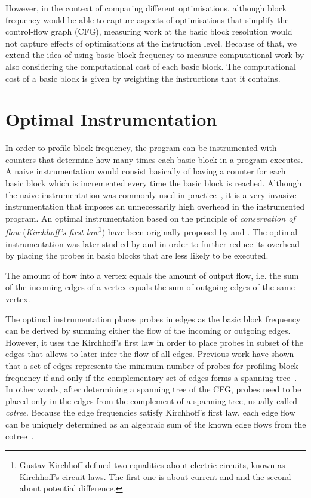 However, in the context of comparing different optimisations, although block frequency would be able to capture aspects of optimisations that simplify the control-flow graph (CFG), measuring work at the basic block resolution would not capture effects of optimisations at the instruction level.
Because of that, we extend the idea of using basic block frequency to measure computational work by also considering the computational cost of each basic block.
The computational cost of a basic block is given by weighting the instructions that it contains.

\section{Optimal Instrumentation} \label{subsec:optimalInstrumentation}

In order to profile  block frequency, the program can be instrumented with counters that determine how many times each basic block in a program executes.
A naive instrumentation would consist basically of having a counter for each basic block which is incremented every time the basic block is reached.
Although the naive instrumentation was commonly used in practice~\citep{knuth71}, it is a very invasive instrumentation that imposes an unnecessarily high overhead in the instrumented program.
An optimal instrumentation based on the principle of \textit{conservation of flow} (\textit{Kirchhoff's first law}\footnote{Gustav Kirchhoff defined two equalities about electric circuits, known as Kirchhoff's circuit laws. The first one is about current and and the second about potential difference.}) have been originally proposed by \cite{nahapetian73} and \cite{knuth73}.
The optimal instrumentation was later studied by \cite{forman81} and \cite{ball94} in order to further reduce its overhead by placing the probes in basic blocks that are less likely to be executed.

\begin{definition}
The amount of flow into a vertex equals the amount of output flow, i.e. the sum of the incoming edges of a vertex equals the sum of outgoing edges of the same vertex.
\end{definition}

The optimal instrumentation places probes in edges as the basic block frequency can be derived by summing either the flow of the incoming or outgoing edges.
However, it uses the Kirchhoff's first law in order to place probes in subset of the edges that allows to later infer the flow of all edges.
Previous work have shown that a set of edges represents the minimum number of probes for profiling block frequency if and only if the complementary set of edges forms a spanning tree~\citep{nahapetian73,ball94}.
In other words, after determining a spanning tree of the CFG, probes need to be placed only in the edges from the complement of a spanning tree, usually called \textit{cotree}.
Because the edge frequencies satisfy Kirchhoff's first law, each edge flow can be uniquely determined as an algebraic sum of the known edge flows from the cotree~\citep{nahapetian73,ball94}.

